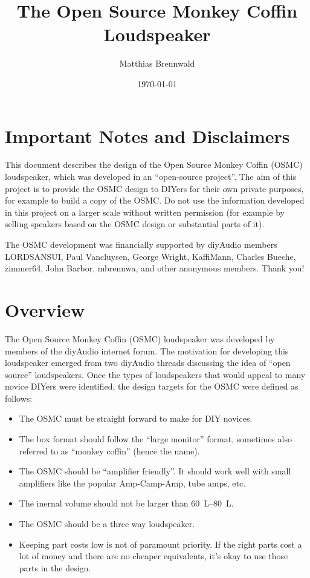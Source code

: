 \documentclass[12pt,a4paper]{article}
\title{The Open Source Monkey Coffin Loudspeaker}
\author{Matthias Brennwald}
\date{\today}
\begin{document}
\maketitle

\vspace{0.2\textheight}

\section*{Important Notes and Disclaimers}
This document describes the design of the Open Source Monkey Coffin (OSMC) loudspeaker, which was developed in an ``open-source project''\cite{osmc_p1}. The aim of this project is to provide the OSMC design to DIYers for their own private purposes, for example to build a copy of the OSMC. Do not use the information developed in this project on a larger scale without written permission (for example by selling speakers based on the OSMC design or substantial parts of it).\par

The OSMC development was financially supported by diyAudio members LORDSANSUI, Paul Vancluysen, George Wright, KaffiMann, Charles Bueche, zimmer64, John Barbor, mbrennwa, and other anonymous members. Thank you!

\clearpage

\section{Overview}
The Open Source Monkey Coffin (OSMC) loudspeaker was developed by members of the diyAudio internet forum\cite{osmc_p1}. The motivation for developing this loudspeaker emerged from two diyAudio threads discussing the idea of ``open source'' loudspeakers\cite{osproj1_p1,osproj2_p1}. Once the types of loudspeakers that would appeal to many novice DIYers were identified, the design targets for the OSMC were defined as follows:

\begin{itemize}
\item The OSMC must be straight forward to make for DIY novices.
\item The box format should follow the ``large monitor'' format, sometimes also referred to as ``monkey coffin'' (hence the name).
\item The OSMC should be ``amplifier friendly''. It should work well with small amplifiers like the popular Amp-Camp-Amp, tube amps, etc.
\item The inernal volume should not be larger than \SIrange{60}{80}{L}.
\item The OSMC should be a three way loudspeaker.
\item Keeping part costs low is not of paramount priority. If the right parts cost a lot of money and there are no cheaper equivalents, it's okay to use those parts in the design.
\end{itemize}
\end{document}

